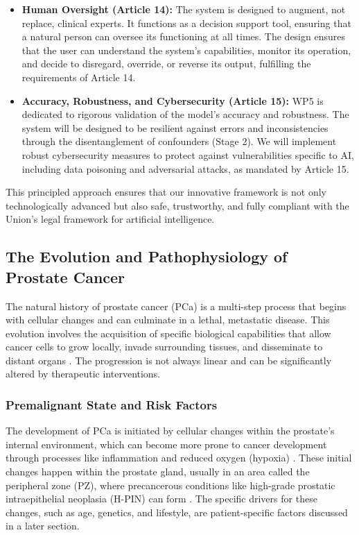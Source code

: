 \documentclass[11pt, a4paper]{article}
\begin{document}
\begin{itemize}
    \item \textbf{Human Oversight (Article 14):} The system is designed to augment, not replace, clinical experts. It functions as a decision support tool, ensuring that a natural person can oversee its functioning at all times. The design ensures that the user can understand the system's capabilities, monitor its operation, and decide to disregard, override, or reverse its output, fulfilling the requirements of Article 14.

    \item \textbf{Accuracy, Robustness, and Cybersecurity (Article 15):} WP5 is dedicated to rigorous validation of the model's accuracy and robustness. The system will be designed to be resilient against errors and inconsistencies through the disentanglement of confounders (Stage 2). We will implement robust cybersecurity measures to protect against vulnerabilities specific to AI, including data poisoning and adversarial attacks, as mandated by Article 15.
\end{itemize}

This principled approach ensures that our innovative framework is not only technologically advanced but also safe, trustworthy, and fully compliant with the Union's legal framework for artificial intelligence.

\subsection{The Evolution and Pathophysiology of Prostate Cancer}
The natural history of prostate cancer (PCa) is a multi-step process that begins with cellular changes and can culminate in a lethal, metastatic disease. This evolution involves the acquisition of specific biological capabilities that allow cancer cells to grow locally, invade surrounding tissues, and disseminate to distant organs \cite{OrzechowskaAnusewicz2022}. The progression is not always linear and can be significantly altered by therapeutic interventions.

\subsubsection{Premalignant State and Risk Factors}
The development of PCa is initiated by cellular changes within the prostate's internal environment, which can become more prone to cancer development through processes like inflammation and reduced oxygen (hypoxia) \cite{BianchiFriasDamodarasamy2019, MartinCaraballo2024}. These initial changes happen within the prostate gland, usually in an area called the peripheral zone (PZ), where precancerous conditions like high-grade prostatic intraepithelial neoplasia (H-PIN) can form \cite{UnknownAuthor2017}. The specific drivers for these changes, such as age, genetics, and lifestyle, are patient-specific factors discussed in a later section.
\end{document}
